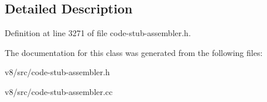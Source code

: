 \subsection{Detailed Description}


Definition at line 3271 of file code-\/stub-\/assembler.\+h.



The documentation for this class was generated from the following files\+:\begin{DoxyCompactItemize}
\item 
v8/src/code-\/stub-\/assembler.\+h\item 
v8/src/code-\/stub-\/assembler.\+cc\end{DoxyCompactItemize}

